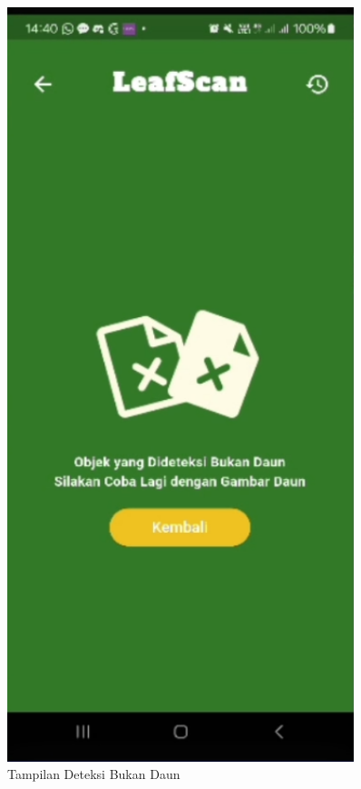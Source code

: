 \documentclass[journal,article,submit,pdftex,moreauthors]{Definitions/mdpi}
\begin{document}
\begin{itemize}
\begin{itemize}
        \begin{figure}[H]
            \centering
            \begin{minipage}{0.4\textwidth}
                \centering
                \includegraphics[width=0.9\textwidth]{Images/not_leaf.png}
                \caption{\centering Tampilan Deteksi Bukan Daun}

\end{minipage}
\end{figure}
\end{itemize}
\end{itemize}
\end{document}
